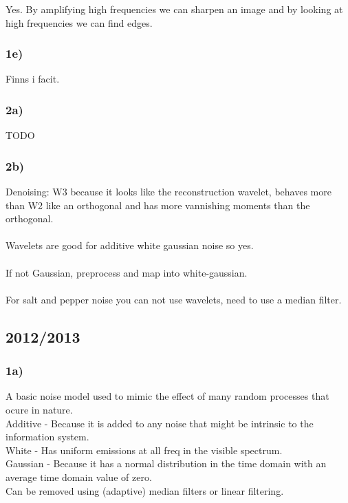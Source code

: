 \documentclass[12pt]{article}
\begin{document}
	    Yes. By amplifying high frequencies we can sharpen an image and by looking at high frequencies we can find edges.
	
	\subsubsection*{1e)}
	
	    Finns i facit.
	    
	\subsubsection*{2a)}
	
	    TODO
	    
	\subsubsection*{2b)}
	    Denoising: W3 because it looks like the reconstruction wavelet, behaves more than W2 like an orthogonal 
	    and has more vannishing moments than the orthogonal.\\
	    \\
	    Wavelets are good for additive white gaussian noise so yes.\\
	    \\
	    If not Gaussian, preprocess and map into white-gaussian.\\
	    \\
	    For salt and pepper noise you can not use wavelets, need to use a median filter.
	    
\subsection{2012/2013}

    \subsubsection*{1a)}
    
        A basic noise model used to mimic the effect of many random processes that ocure in nature. \\
        Additive - Because it is added to any noise that might be intrinsic to the information system.\\
        White - Has uniform emissions at all freq in the visible spectrum.\\
        Gaussian - Because it has a normal distribution in the time domain with an average time domain value of zero.\\
        Can be removed using (adaptive) median filters or linear filtering.
        
\end{document}
